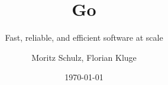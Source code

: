 \usepackage[english]{babel}

\usepackage[utf8]{inputenc}

\title{Go}
\subtitle{ Fast, reliable, and efficient software at scale}
\date{\today}
\author{Moritz Schulz, Florian Kluge}

\lstset{
  language = Go,
  showspaces = false,
  showtabs = false,
  showstringspaces = false,
  escapechar = @,
  belowskip=-1.5em
}

\def\ContinueLineNumber{\lstset{firstnumber=last}}
\def\StartLineAt#1{\lstset{firstnumber=#1}}
\let\numberLineAt\StartLineAt

\makeatletter
